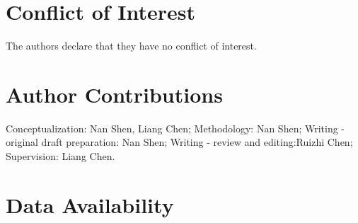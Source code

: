 \documentclass{svjour3}                     %
\begin{document}
%
\section*{Conflict of Interest}
The authors declare that they have no conflict of interest.
\section*{Author Contributions}
Conceptualization: Nan Shen, Liang Chen; Methodology: Nan Shen; Writing - original draft preparation: Nan Shen; Writing - review and editing:Ruizhi Chen; Supervision: Liang Chen.
 \section*{Data Availability}



\end{document}
